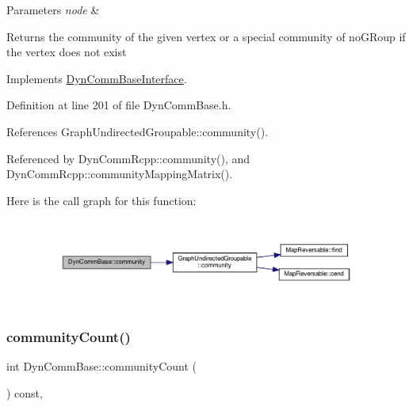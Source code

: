 \begin{DoxyParams}{Parameters}
{\em node} & \\
\hline
\end{DoxyParams}
\begin{DoxyReturn}{Returns}
the community of the given vertex or a special community of no\+G\+Roup if the vertex does not exist 
\end{DoxyReturn}


Implements \hyperlink{classDynCommBaseInterface_a9453a177580033aa1d4d9f165350ceba}{Dyn\+Comm\+Base\+Interface}.



Definition at line 201 of file Dyn\+Comm\+Base.\+h.



References Graph\+Undirected\+Groupable\+::community().



Referenced by Dyn\+Comm\+Rcpp\+::community(), and Dyn\+Comm\+Rcpp\+::community\+Mapping\+Matrix().

Here is the call graph for this function\+:\nopagebreak
\begin{figure}[H]
\begin{center}
\leavevmode
\includegraphics[width=350pt]{classDynCommBase_a651753518a2de4ea52caea518e74d878_cgraph}
\end{center}
\end{figure}
\mbox{\label{classDynCommBase_add5d1d59a3f20b4ba039342b31551fb3}} 
\subsubsection{\texorpdfstring{community\+Count()}{communityCount()}}
{\footnotesize\ttfamily int Dyn\+Comm\+Base\+::community\+Count (\begin{DoxyParamCaption}{ }\end{DoxyParamCaption}) const\hspace{0.3cm}{\ttfamily [inline]}, {\ttfamily [virtual]}}


